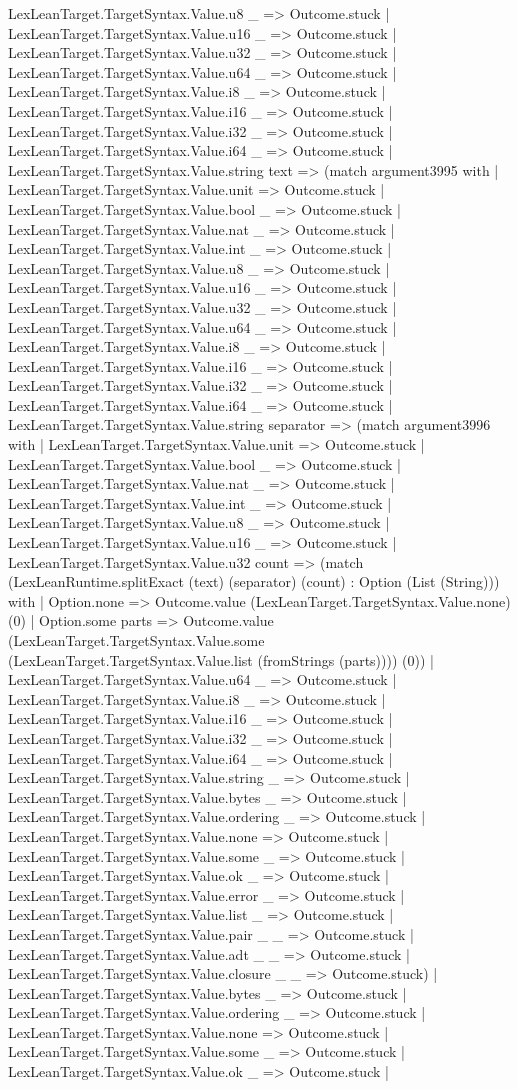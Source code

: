 \documentclass[11pt]{article}
\begin{document}
LexLeanTarget.TargetSyntax.Value.u8 \_ => Outcome.stuck | LexLeanTarget.TargetSyntax.Value.u16 \_ => Outcome.stuck | LexLeanTarget.TargetSyntax.Value.u32 \_ => Outcome.stuck | LexLeanTarget.TargetSyntax.Value.u64 \_ => Outcome.stuck | LexLeanTarget.TargetSyntax.Value.i8 \_ => Outcome.stuck | LexLeanTarget.TargetSyntax.Value.i16 \_ => Outcome.stuck | LexLeanTarget.TargetSyntax.Value.i32 \_ => Outcome.stuck | LexLeanTarget.TargetSyntax.Value.i64 \_ => Outcome.stuck | LexLeanTarget.TargetSyntax.Value.string text => (match argument3995 with | LexLeanTarget.TargetSyntax.Value.unit => Outcome.stuck | LexLeanTarget.TargetSyntax.Value.bool \_ => Outcome.stuck | LexLeanTarget.TargetSyntax.Value.nat \_ => Outcome.stuck | LexLeanTarget.TargetSyntax.Value.int \_ => Outcome.stuck | LexLeanTarget.TargetSyntax.Value.u8 \_ => Outcome.stuck | LexLeanTarget.TargetSyntax.Value.u16 \_ => Outcome.stuck | LexLeanTarget.TargetSyntax.Value.u32 \_ => Outcome.stuck | LexLeanTarget.TargetSyntax.Value.u64 \_ => Outcome.stuck | LexLeanTarget.TargetSyntax.Value.i8 \_ => Outcome.stuck | LexLeanTarget.TargetSyntax.Value.i16 \_ => Outcome.stuck | LexLeanTarget.TargetSyntax.Value.i32 \_ => Outcome.stuck | LexLeanTarget.TargetSyntax.Value.i64 \_ => Outcome.stuck | LexLeanTarget.TargetSyntax.Value.string separator => (match argument3996 with | LexLeanTarget.TargetSyntax.Value.unit => Outcome.stuck | LexLeanTarget.TargetSyntax.Value.bool \_ => Outcome.stuck | LexLeanTarget.TargetSyntax.Value.nat \_ => Outcome.stuck | LexLeanTarget.TargetSyntax.Value.int \_ => Outcome.stuck | LexLeanTarget.TargetSyntax.Value.u8 \_ => Outcome.stuck | LexLeanTarget.TargetSyntax.Value.u16 \_ => Outcome.stuck | LexLeanTarget.TargetSyntax.Value.u32 count => (match (LexLeanRuntime.splitExact (text) (separator) (count) : Option (List (String))) with | Option.none => Outcome.value (LexLeanTarget.TargetSyntax.Value.none) (0) | Option.some parts => Outcome.value (LexLeanTarget.TargetSyntax.Value.some (LexLeanTarget.TargetSyntax.Value.list (fromStrings (parts)))) (0)) | LexLeanTarget.TargetSyntax.Value.u64 \_ => Outcome.stuck | LexLeanTarget.TargetSyntax.Value.i8 \_ => Outcome.stuck | LexLeanTarget.TargetSyntax.Value.i16 \_ => Outcome.stuck | LexLeanTarget.TargetSyntax.Value.i32 \_ => Outcome.stuck | LexLeanTarget.TargetSyntax.Value.i64 \_ => Outcome.stuck | LexLeanTarget.TargetSyntax.Value.string \_ => Outcome.stuck | LexLeanTarget.TargetSyntax.Value.bytes \_ => Outcome.stuck | LexLeanTarget.TargetSyntax.Value.ordering \_ => Outcome.stuck | LexLeanTarget.TargetSyntax.Value.none => Outcome.stuck | LexLeanTarget.TargetSyntax.Value.some \_ => Outcome.stuck | LexLeanTarget.TargetSyntax.Value.ok \_ => Outcome.stuck | LexLeanTarget.TargetSyntax.Value.error \_ => Outcome.stuck | LexLeanTarget.TargetSyntax.Value.list \_ => Outcome.stuck | LexLeanTarget.TargetSyntax.Value.pair \_ \_ => Outcome.stuck | LexLeanTarget.TargetSyntax.Value.adt \_ \_ => Outcome.stuck | LexLeanTarget.TargetSyntax.Value.closure \_ \_ => Outcome.stuck) | LexLeanTarget.TargetSyntax.Value.bytes \_ => Outcome.stuck | LexLeanTarget.TargetSyntax.Value.ordering \_ => Outcome.stuck | LexLeanTarget.TargetSyntax.Value.none => Outcome.stuck | LexLeanTarget.TargetSyntax.Value.some \_ => Outcome.stuck | LexLeanTarget.TargetSyntax.Value.ok \_ => Outcome.stuck | 
\end{document}

